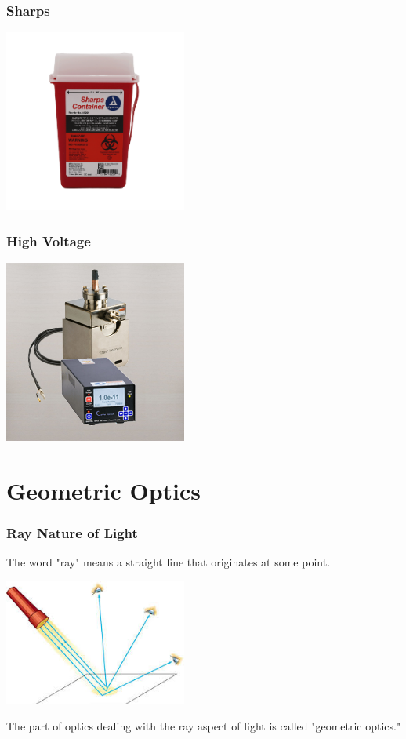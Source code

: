 \documentclass{beamer}
\begin{document}
\begin{frame}\frametitle{Sharps}
\begin{center}
\includegraphics[width=6cm]{fig/sharps.png}
\end{center}
\end{frame}


\begin{frame}\frametitle{High Voltage}
\begin{center}
\includegraphics[width=6cm]{fig/highV.jpg}
\end{center}
\end{frame}

\section{Geometric Optics}

\begin{frame}\frametitle{Ray Nature of Light}
The word "ray" means a straight line that originates at some point.

\begin{center}
\includegraphics[width=6cm]{fig/rays.jpg}
\end{center}

The part of optics dealing with the ray aspect of light is called "geometric optics."

\end{frame}
\end{document}
